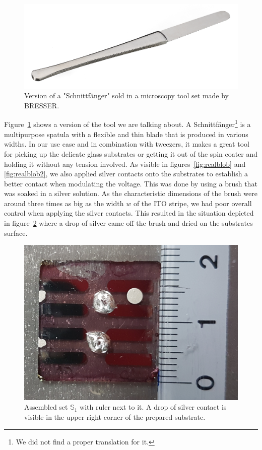 \documentclass[a4paper,10pt,twocolumn]{article}
\begin{document}
\begin{extract*}
\begin{figure}[h]\centering
	\includegraphics[width=\columnwidth]{../n-1_Pictures/Schnittfaenger.png}
	\caption{Version of a "Schnittfänger" sold in a microscopy tool set made by BRESSER.}
	\label{fig:cutcatcher}
\end{figure}
Figure~\ref{fig:cutcatcher} shows a version of the tool we are talking about. A Schnittfänger\footnote{We did not find a proper translation for it.} is a multipurpose spatula with a flexible and thin blade that is produced in various widths. In our use case and in combination with tweezers, it makes a great tool for picking up the delicate glass substrates or getting it out of the spin coater and holding it without any tension involved.\mypar
As visible in figures~\ref{fig:realblob} and \ref{fig:realblob2}, we also applied silver contacts onto the substrates to establish a better contact when modulating the voltage. This was done by using a brush that was soaked in a silver solution. As the characteristic dimensions of the brush were around three times as big as the width $w$ of the ITO stripe, we had poor overall control when applying the silver contacts. This resulted in the situation depicted in figure~\ref{fig:realblob3} where a drop of silver came off the brush and dried on the substrates surface.

\begin{figure}[h]\centering
	\includegraphics[width=0.9\columnwidth]{../n-1_Pictures/cell1.png}
	\caption{Assembled set $\mathbb{S}_1$ with ruler next to it. A drop of silver contact is visible in the upper right corner of the prepared substrate.}
	\label{fig:realblob3}
\end{figure}


\end{extract*}
\end{document}
